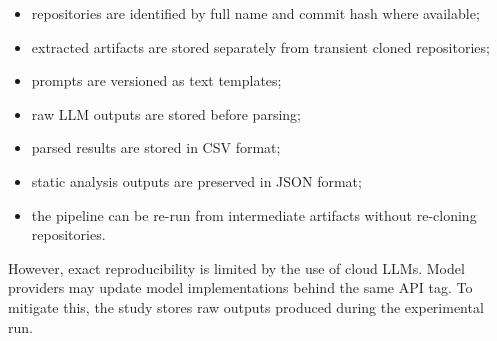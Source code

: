 \begin{itemize}
    \item repositories are identified by full name and commit hash where available;
    \item extracted artifacts are stored separately from transient cloned repositories;
    \item prompts are versioned as text templates;
    \item raw LLM outputs are stored before parsing;
    \item parsed results are stored in CSV format;
    \item static analysis outputs are preserved in JSON format;
    \item the pipeline can be re-run from intermediate artifacts without re-cloning repositories.
\end{itemize}

However, exact reproducibility is limited by the use of cloud LLMs. Model providers may update model implementations behind the same API tag. To mitigate this, the study stores raw outputs produced during the experimental run.

